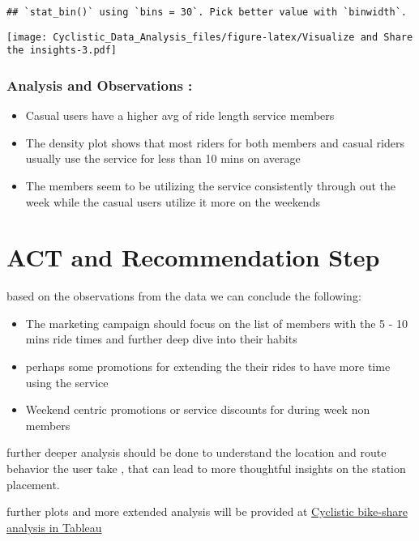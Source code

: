 \documentclass[
]{article}
\providecommand{\tightlist}{%
  \setlength{\itemsep}{0pt}\setlength{\parskip}{0pt}}
\begin{document}
\begin{verbatim}
## `stat_bin()` using `bins = 30`. Pick better value with `binwidth`.
\end{verbatim}

\texttt{[image: Cyclistic\_Data\_Analysis\_files/figure-latex/Visualize and Share the insights-3.pdf]}

\hypertarget{analysis-and-observations}{%
\subsubsection{Analysis and Observations
:}\label{analysis-and-observations}}

\begin{itemize}
\tightlist
\item
  Casual users have a higher avg of ride length service members
\item
  The density plot shows that most riders for both members and casual
  riders usually use the service for less than 10 mins on average
\item
  The members seem to be utilizing the service consistently through out
  the week while the casual users utilize it more on the weekends
\end{itemize}

\hypertarget{act-and-recommendation-step}{%
\section{ACT and Recommendation
Step}\label{act-and-recommendation-step}}

based on the observations from the data we can conclude the following:

\begin{itemize}
\tightlist
\item
  The marketing campaign should focus on the list of members with the 5
  - 10 mins ride times and further deep dive into their habits
\item
  perhaps some promotions for extending the their rides to have more
  time using the service
\item
  Weekend centric promotions or service discounts for during week non
  members
\end{itemize}

further deeper analysis should be done to understand the location and
route behavior the user take , that can lead to more thoughtful insights
on the station placement.

further plots and more extended analysis will be provided at
\href{https://public.tableau.com/app/profile/jihad.al.hussain/viz/Cyclisticbike-shareanalysis_16413688581510/Dashboard1}{Cyclistic
bike-share analysis in Tableau}
\end{document}
